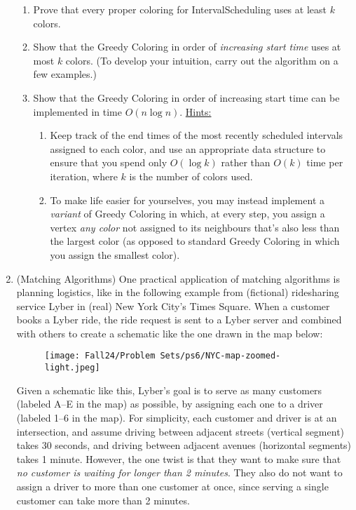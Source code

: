 \documentclass[11pt]{article}
\begin{document}
\begin{enumerate}
 \begin{enumerate}
     \item Prove that every proper coloring for IntervalScheduling uses at least $k$ colors.\\
     \item Show that the Greedy Coloring in order of {\em increasing start time} uses at most $k$ colors.  (To develop your intuition, carry out the algorithm on a few examples.)
     \item Show that the Greedy Coloring in order of increasing start time can be implemented in time $O(n\log n)$. \uline{Hints:} \begin{enumerate}
         \item Keep track of the end times of the most recently scheduled intervals assigned to each color, and use an appropriate data structure to ensure that you spend only $O(\log k)$ rather than $O(k)$ time per iteration, where $k$ is the number of colors used.
         \item To make life easier for yourselves, you may instead implement a \emph{variant} of Greedy Coloring in which, at every step, you assign a vertex \emph{any color} not assigned to its neighbours that's also less than the largest color (as opposed to standard Greedy Coloring in which you assign the smallest color).\\
     \end{enumerate}
\end{enumerate}


    \item (Matching Algorithms) 
    One practical application of matching algorithms is planning logistics, like in the following example from (fictional) ridesharing service Lyber in (real) New York City's Times Square.  When a customer books a Lyber ride, the ride request is sent to a Lyber server and combined with others to create a schematic like the one drawn in the map below:

    \begin{figure}[H]
        \centering
        \texttt{[image: Fall24/Problem Sets/ps6/NYC-map-zoomed-light.jpeg]}
        \label{fig:travel_time_graph}
    \end{figure}

    Given a schematic like this, Lyber's goal is to serve as many customers (labeled A--E in the map) as possible, by assigning each one to a driver (labeled 1--6 in the map). For simplicity, each customer and driver is at an intersection, and assume driving between adjacent streets (vertical segment) takes 30 seconds, and driving between adjacent avenues (horizontal segments) takes 1 minute. However, the one twist is that they want to make sure that \textit{no customer is waiting for longer than 2 minutes}.  They also do not want to assign a driver to more than one customer at once, since serving a single customer can take more than 2 minutes.


\end{enumerate}
\end{document}
